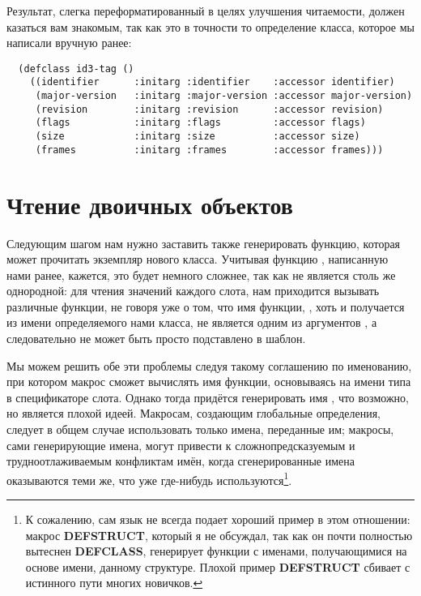 Результат, слегка переформатированный в целях улучшения читаемости, должен казаться вам
знакомым, так как это в точности то определение класса, которое мы написали вручную ранее:

\begin{lstlisting}
  (defclass id3-tag ()
    ((identifier      :initarg :identifier    :accessor identifier)
     (major-version   :initarg :major-version :accessor major-version)
     (revision        :initarg :revision      :accessor revision)
     (flags           :initarg :flags         :accessor flags)
     (size            :initarg :size          :accessor size)
     (frames          :initarg :frames        :accessor frames)))
\end{lstlisting}

\section{Чтение двоичных объектов}

Следующим шагом нам нужно заставить  также генерировать функцию,
которая может прочитать экземпляр нового класса. Учитывая функцию ,
написанную нами ранее, кажется, это будет немного сложнее, так как  не
является столь же однородной: для чтения значений каждого слота, нам приходится вызывать
различные функции, не говоря уже о том, что имя функции, , хоть и
получается из имени определяемого нами класса, не является одним из аргументов
, а следовательно не может быть просто подставлено в шаблон.

Мы можем решить обе эти проблемы следуя такому соглашению по именованию, при котором
макрос сможет вычислять имя функции, основываясь на имени типа в спецификаторе
слота. Однако тогда  придётся генерировать имя
, что возможно, но является плохой идеей. Макросам, создающим
глобальные определения, следует в общем случае использовать только имена, переданные им;
макросы, сами генерирующие имена, могут привести к сложнопредсказуемым и
трудноотлаживаемым конфликтам имён, когда сгенерированные имена оказываются теми же, что
уже где-нибудь используются\footnote{К сожалению, сам язык не всегда подает хороший пример
  в этом отношении: макрос \textbf{DEFSTRUCT}, который я не обсуждал, так как он почти
  полностью вытеснен \textbf{DEFCLASS}, генерирует функции с именами, получающимися на
  основе имени, данному структуре. Плохой пример \textbf{DEFSTRUCT} сбивает с истинного
  пути многих новичков.}.

